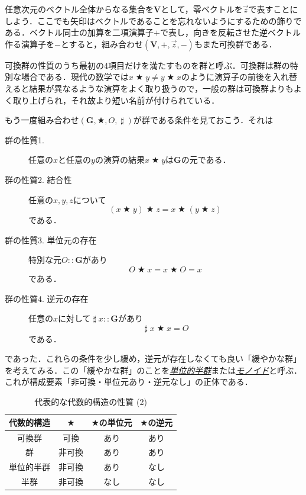 \documentclass[a4paper]{jsbook}
\newcommand{\keyword}[1]{{\underline{\emph{#1}}}}
\newcommand{\mathSet}[1]{\mathbf{#1}} %
\newcommand{\mathVectorVar}[1]{\vec{#1}}
\DeclareMathOperator{\mathInverse}{\sharp}  %
\newcommand{\mathAnyBinaryOperator}{\mathbin{\bigstar}}
\newcommand{\mathIn}{\mathrel{::}}
\newcommand{\mathGroup}[4]{(#1,#2,#3,#4)}
\begin{document}
任意次元のベクトル全体からなる集合を$\mathSet{V}$として，零ベクトルを$\mathVectorVar{z}$で表すことにしよう．ここでも矢印はベクトルであることを忘れないようにするための飾りである．ベクトル同士の加算を二項演算子$+$で表し，向きを反転させた逆ベクトル作る演算子を$-$とすると，組み合わせ$\mathGroup{\mathSet{V}}{+}{\mathVectorVar{z}}{-}$もまた可換群である．

可換群の性質のうち最初の4項目だけを満たすものを群と呼ぶ．可換群は群の特別な場合である．現代の数学では$x\mathAnyBinaryOperator y\neq y\mathAnyBinaryOperator x$のように演算子の前後を入れ替えると結果が異なるような演算をよく取り扱うので，一般の群は可換群よりもよく取り上げられ，それ故より短い名前が付けられている．

もう一度組み合わせ$\mathGroup{\mathSet{G}}{\mathAnyBinaryOperator}{O}{\mathInverse}$が群である条件を見ておこう．それは
\begin{description}
\item[群の性質1.] 任意の$x$と任意の$y$の演算の結果$x\mathAnyBinaryOperator y$は$\mathSet{G}$の元である．
\item[群の性質2. 結合性] 任意の$x,y,z$について
\begin{equation}
(x\mathAnyBinaryOperator y)\mathAnyBinaryOperator z=x\mathAnyBinaryOperator(y\mathAnyBinaryOperator z)
\end{equation}
である．
\item[群の性質3. 単位元の存在] 特別な元$O\mathIn\mathSet{G}$があり
\begin{equation}
O\mathAnyBinaryOperator x=x\mathAnyBinaryOperator O=x
\end{equation}
である．
\item[群の性質4. 逆元の存在] 任意の$x$に対して$\mathInverse x\mathIn\mathSet{G}$があり
\begin{equation}
\mathInverse x\mathAnyBinaryOperator x=O
\end{equation}
である．
\end{description}
であった．これらの条件を少し緩め，逆元が存在しなくても良い「緩やかな群」を考えてみる．この「緩やかな群」のことを\keyword{単位的半群}または\keyword{モノイド}と呼ぶ．これが構成要素「非可換・単位元あり・逆元なし」の正体である．

\begin{table}
\caption{代表的な代数的構造の性質 (2)}
\label{tab:group-and-monoid}
\begin{center}
\begin{tabular}{||c||c|c|c||}
\hline
代数的構造&$\mathAnyBinaryOperator$&$\mathAnyBinaryOperator$の単位元&$\mathAnyBinaryOperator$の逆元\\
\hline\hline
可換群&可換&あり&あり\\
群&非可換&あり&あり\\
単位的半群&非可換&あり&なし\\
半群&非可換&なし&なし\\
\hline
\end{tabular}
\end{center}
\end{table}
\end{document}

